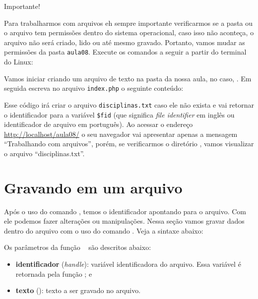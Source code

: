 \begin{framed}
{\Large Importante!}

Para trabalharmos com arquivos eh sempre importante verificarmos se a pasta ou o arquivo 
tem permissões dentro do sistema operacional, caso isso não aconteça, o arquivo não 
será criado, lido ou até mesmo gravado. Portanto, vamos mudar as permissões da pasta
\texttt{aula08}. Execute os comandos a seguir a partir do terminal do Linux:



\end{framed}

Vamos iniciar criando um arquivo de texto na pasta da nossa aula, no caso, 
. Em seguida escreva no arquivo \texttt{index.php} o 
seguinte conteúdo:



Esse código irá criar o arquivo \texttt{disciplinas.txt} caso ele não exista e
vai retornar o identificador para a variável \texttt{\$fid} (que significa 
\textit{file identifier} em inglês ou identificador de arquivo em português).
Ao acessar o endereço \url{http://localhost/aula08/} o seu navegador
vai apresentar apenas a mensagem ``Trabalhando com arquivos'', porém, se 
verificarmos o diretório , vamos visualizar o arquivo
``disciplinas.txt''.

\section{Gravando em um arquivo}
\label{gravando-em-um-arquivo}

Após o uso do comando \funcaofopen, temos o identificador apontando para o 
arquivo. Com ele podemos fazer alterações ou manipulações. Nessa seção vamos 
gravar dados dentro do arquivo com o uso do comando \funcaofwrite. Veja a sintaxe
abaixo:



Os parâmetros da função \funcaofwrite~ são descritos abaixo:

\begin{itemize}
  \item \textbf{identificador} (\textit{handle}): variável identificadora do
  arquivo. Essa variável é retornada pela função \funcaofopen; e
  \item \textbf{texto} (\tipostring): texto a ser gravado no arquivo.
\end{itemize}

